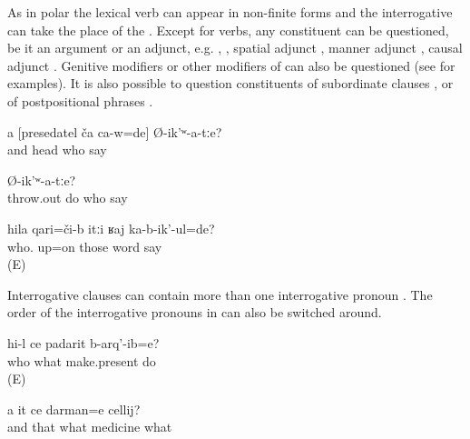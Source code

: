 As in polar  the lexical verb can appear in non-finite forms  and the interrogative  can take the place of the  . Except for verbs, any constituent can be questioned, be it an argument or an adjunct, e.g.  , , spatial adjunct , manner adjunct , causal adjunct . Genitive modifiers or other modifiers of  can also be questioned (see  for examples). It is also possible to question constituents of subordinate clauses ,  or of postpositional phrases .
%
\begin{exe}
	\ex	\label{ex:‎Who did you say was the head (of the kolkhoz)}
	\gll	a	[presedatel	ča 	ca-w=de]	Ø-ik'ʷ-a-tːe?\\
		and	head	who		say\\
	\glt	{}

	\ex	\label{ex:The ones who were thrown out, who did you (masc.) say was this}
		Ø-ik'ʷ-a-tːe?\\
		throw.out	do 	who	say\\
	\glt	{}

	\ex	\label{ex:About whom were they talking}
	\gll	hila	qari=či-b	itːi	ʁaj	ka-b-ik'-ul=de?\\
		who.	up=on	those	word	say\\
	\glt	{} (E)
\end{exe}

Interrogative clauses can contain more than one interrogative pronoun . The order of the interrogative pronouns in  can also be switched around.
%
\begin{exe}
	\ex	\label{ex:Who did make which present}
	\gll	hi-l ce padarit b-arq'-ib=e?\\
		who	what	make.present	do\\
	\glt	{} (E)

	\ex	\label{ex:‎‎‎And this is what medicine for what}
	\gll	a	it	ce	darman=e	cellij?\\
		and	that	what	medicine	what\\
	\glt	{}
\end{exe}

